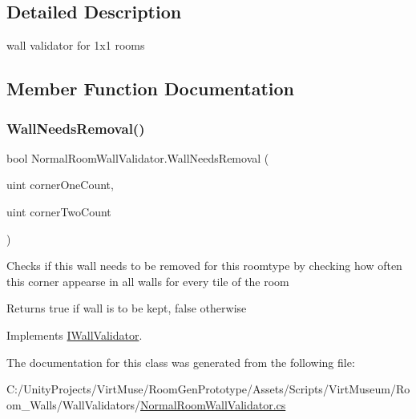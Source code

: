 \subsection{Detailed Description}
wall validator for 1x1 rooms 



\subsection{Member Function Documentation}
\mbox{\label{class_normal_room_wall_validator_a30c0496c8203077f3c327da93f38f7c7}} 
\subsubsection{\texorpdfstring{Wall\+Needs\+Removal()}{WallNeedsRemoval()}}
{\footnotesize\ttfamily bool Normal\+Room\+Wall\+Validator.\+Wall\+Needs\+Removal (\begin{DoxyParamCaption}\item[{uint}]{corner\+One\+Count,  }\item[{uint}]{corner\+Two\+Count }\end{DoxyParamCaption})}



Checks if this wall needs to be removed for this roomtype by checking how often this corner appearse in all walls for every tile of the room 

\begin{DoxyReturn}{Returns}
true if wall is to be kept, false otherwise
\end{DoxyReturn}


Implements \mbox{\hyperlink{interface_i_wall_validator_a1618acf45bf2614985aeb8b240bf7da8}{I\+Wall\+Validator}}.



The documentation for this class was generated from the following file\+:\begin{DoxyCompactItemize}
\item 
C\+:/\+Unity\+Projects/\+Virt\+Muse/\+Room\+Gen\+Prototype/\+Assets/\+Scripts/\+Virt\+Museum/\+Room\+\_\+\+Walls/\+Wall\+Validators/\mbox{\hyperlink{_normal_room_wall_validator_8cs}{Normal\+Room\+Wall\+Validator.\+cs}}\end{DoxyCompactItemize}
